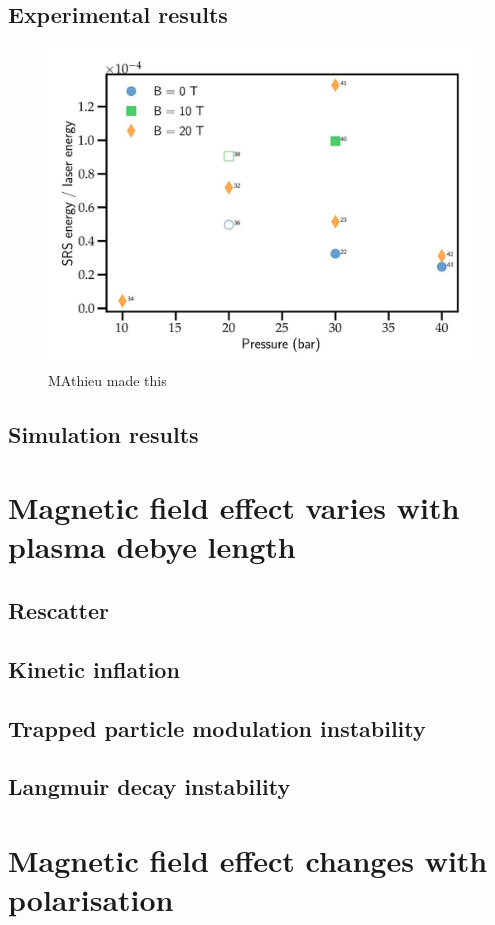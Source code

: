 \subsection{Experimental results}
\begin{figure}[ht]
   \centering
    \includegraphics[width=0.75\columnwidth]{Chapters/C6_magSRS/SRS_LULI.png}
    \caption{MAthieu made this}
    \label{fig:SRS_LULI}
\end{figure}{}


\subsection{Simulation results}

\section{Magnetic field effect varies with plasma debye length}
\subsection{Rescatter}
\subsection{Kinetic inflation}
\subsection{Trapped particle modulation instability}
\subsection{Langmuir decay instability}

\section{Magnetic field effect changes with polarisation}




